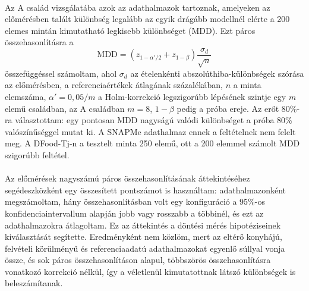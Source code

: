 \paragraph{}Az A család vizsgálatába azok az adathalmazok tartoznak, amelyeken az előmérésben 
talált különbség legalább az egyik drágább modellnél elérte a 200 elemes mintán kimutatható 
legkisebb különbséget (MDD). Ezt páros összehasonlításra a
\begin{equation}
  \mathrm{MDD} = \left(z_{1-\alpha'/2} + z_{1-\beta}\right)\frac{\sigma_d}{\sqrt{n}}
\end{equation}
összefüggéssel számoltam, ahol $\sigma_d$ az ételenkénti abszolúthiba-különbségek szórása az 
előmérésben, a referenciaértékek átlagának százalékában, $n$ a minta elemszáma, $\alpha' = 0{,}05/m$ a Holm-korrekció legszigorúbb 
lépésének szintje egy $m$ elemű családban, az A családban $m = 8$, $1-\beta$ pedig a próba ereje. Az 
erőt 80\%-ra választottam: egy pontosan MDD nagyságú valódi 
különbséget a próba 80\% valószínűséggel mutat ki. A SNAPMe adathalmaz ennek a feltételnek nem 
felelt meg. A DFood-Tj-n a tesztelt minta 250 elemű, ott a 200 elemmel számolt MDD szigorúbb feltétel.

\paragraph{}Az előmérések nagyszámú páros összehasonlításának áttekintéséhez segédeszközként 
egy összesített pontszámot is használtam: adathalmazonként megszámoltam, hány összehasonlításban 
volt egy konfiguráció a 95\%-os konfidenciaintervallum alapján jobb vagy rosszabb a többinél, 
és ezt az adathalmazokra átlagoltam. Ez az áttekintés a döntési mérés hipotéziseinek 
kiválasztását segítette. Eredményként nem közlöm, mert az eltérő konyhájú, felvételi 
körülményű és referenciaadatú adathalmazokat egyenlő súllyal vonja össze, és sok páros 
összehasonlításon alapul, többszörös összehasonlításra vonatkozó korrekció nélkül, így a 
véletlenül kimutatottnak látszó különbségek is beleszámítanak.

